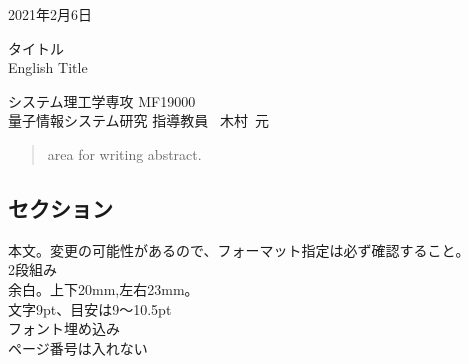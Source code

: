 \documentclass[9pt,a4j]{jsarticle} %
\begin{document}
%
\begin{flushright}
2021年2月6日
\end{flushright}
\begin{center}
\LARGE{タイトル}\\
\large{English Title}
\end{center}
\noindent
システム理工学専攻 \hfill MF19000 \ \  \\
量子情報システム研究 \hfill 指導教員 \ 木村\ 元\ \ \ \ 
%
\begin{abstract}
area for writing abstract.
\end{abstract}
%
\begin{multicols}{2}%
\section{セクション}
本文。変更の可能性があるので、フォーマット指定は必ず確認すること。\\
2段組み\\
余白。上下20mm,左右23mm。\\
文字9pt、目安は9～10.5pt\\
フォント埋め込み\\
ページ番号は入れない

%
%
\end{multicols}
\end{document}

